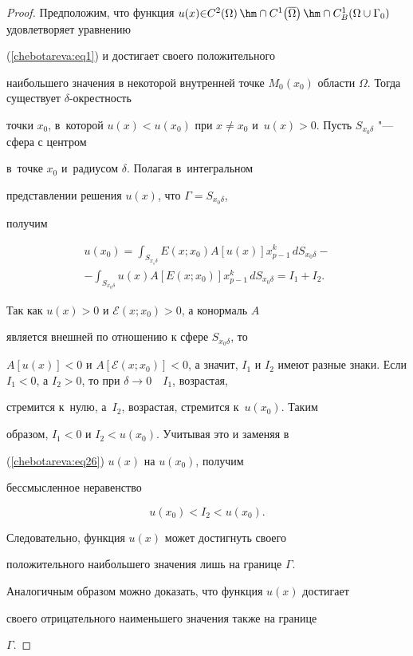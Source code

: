 \begin{proof}


Предположим,  что функция $u(x) {\in} C^2\!\left( \Omega \right) \hm\cap


C^1\!\left( {\overline \Omega } \right) \hm\cap C_B^1 \!\left( {\Omega


\cup \Gamma _0 } \right)$ удовлетворяет уравнению


(\ref{chebotareva:eq1}) и достигает своего положительного


наибольшего значения в некоторой внутренней точке $M_0 \left( {x_0


} \right)$ области $\Omega $. Тогда существует $\delta $-окрестность 


точки $x_0 $,  в~которой $u(x) < u(x_0 )$ при $x \ne


x_0 $ и~$u(x) > 0$. Пусть $S_{x_0 \delta } $ "--- сфера с центром


в~точке $x_0 $ и~радиусом $\delta $. Полагая в~интегральном


представлении решения $u(x)$,  что $\Gamma = S_{x_0 \delta } $, 


получим


\begin{multline}


\label{chebotareva:eq26} u(x_0 ) = \int_{S_{x_{_0 } \delta


} } E(x; x_0 )A\left[ u(x) \right]x_{p - 1}^k \, dS_{x_0 \delta} -\\-


 \int_{S_{x_0 \delta }}  u(x)A\left[ E(x; x_0 )


\right]x_{p - 1}^k \, dS_{x_0 \delta } = I_1 + I_2.


\end{multline}


Так как $u(x) > 0$ и $\mathcal{E}(x; x_0 ) > 0$,  а конормаль $A$


является внешней по отношению к сфере $S_{x_0 \delta } $,  то


$A\left[ {u(x)} \right] < 0$ и $A\left[ {\mathcal{E}(x; x_0 )}


\right] < 0$,  а значит, $I_1 $ и $I_2 $ имеют разные знаки. Если $I_1 <


0$,  а $I_2 > 0$,  то при $\delta \to 0 \quad I_1 $, возрастая,


стремится к~нулю,  а~$I_2 $, возрастая, стремится к~$u(x_0 )$. Таким


образом,  $I_1 < 0$ и $I_2 < u(x_0 )$. Учитывая это  и заменяя в


(\ref{chebotareva:eq26}) $u(x)$ на $u(x_0 )$,  получим


бессмысленное неравенство


\[u(x_0 ) < I_2 < u(x_0 ).\]


Следовательно,  функция $u(x)$ может достигнуть своего


положительного наибольшего значения лишь на границе $\Gamma$.


Аналогичным образом можно доказать,  что функция $u(x)$ достигает


своего отрицательного наименьшего значения также на границе


$\Gamma $.


\end{proof}


